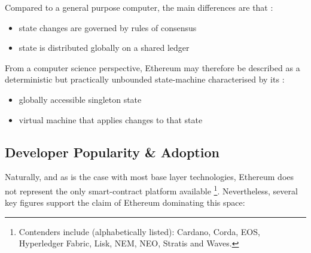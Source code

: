 Compared to a general purpose computer, the main differences are that \cite[p.~28]{Antonopoulos.2018}:

\begin{itemize}
  \item state changes are governed by rules of consensus
  \item state is distributed globally on a shared ledger
\end{itemize}

From a computer science perspective, Ethereum may therefore be described as a deterministic but practically unbounded state-machine characterised by its \cite[p.~23]{Antonopoulos.2018}: 

\begin{itemize}
  \item globally accessible singleton state
  \item virtual machine that applies changes to that state
\end{itemize}
 








\subsection{Developer Popularity \& Adoption}
Naturally, and as is the case with most base layer technologies, Ethereum does not represent the only smart-contract platform available \footnote{Contenders include (alphabetically listed): Cardano, Corda, EOS, Hyperledger Fabric, Lisk, NEM, NEO, Stratis and Waves.}. Nevertheless, several key figures support the claim of Ethereum dominating this space: 

